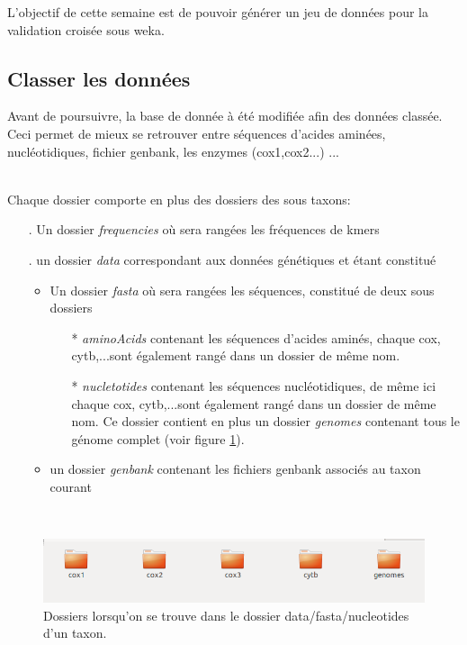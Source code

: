 L'objectif de cette semaine est de pouvoir générer un jeu de données pour la validation croisée sous weka.

\subsection{Classer les données}

Avant de poursuivre, la base de donnée à été modifiée afin des données classée. Ceci permet de mieux se retrouver entre séquences d'acides aminées, nucléotidiques, fichier genbank, les enzymes (cox1,cox2...) ...

~\\
Chaque dossier comporte en plus des dossiers des sous taxons:

\begin{itemize}
 \item[.]Un dossier \textit{frequencies} où sera rangées les fréquences de kmers
  \item[.]un dossier \textit{data} correspondant aux données génétiques et étant constitué
  \begin{itemize}
 \item Un dossier \textit{fasta} où sera rangées les séquences, constitué de deux sous dossiers 
  \begin{itemize}
 \item[*]\textit{aminoAcids} contenant les séquences d'acides aminés, chaque cox, cytb,...sont également rangé dans un dossier de même nom. 
 
  \item[*]\textit{nucletotides} contenant les séquences nucléotidiques, de même ici chaque cox, cytb,...sont également rangé dans un dossier de même nom. Ce dossier contient en plus un dossier \textit{genomes} contenant tous le génome complet (voir figure \ref{dossierCox}).
  
\end{itemize}
  \item un dossier \textit{genbank} contenant les fichiers genbank associés au taxon courant
  
\end{itemize}
\end{itemize}
~\\

\begin{figure}[H]
\begin{center}
\includegraphics[scale=0.5]{./../img/dossier.png}
\caption{\label{dossierCox} Dossiers lorsqu'on se trouve dans le dossier data/fasta/nucleotides d'un taxon.}
\end{center}
\end{figure}
~\\

